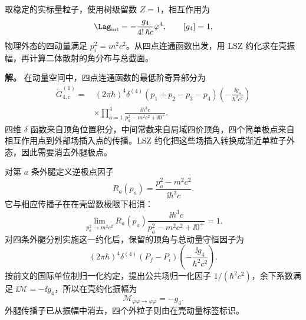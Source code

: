 
\begin{exbox}
取稳定的实标量粒子，使用树级留数 $Z=1$，相互作用为
\begin{equation*}
 \Lag_{\rm int}=-\frac{g_4}{4!\,\hbar c}\varphi^4,
 \qquad [g_4]=1,
\end{equation*}
物理外态的四动量满足 $p_i^2=m^2c^2$。从四点连通函数出发，用 LSZ 约化求在壳振幅，再计算二体散射的角分布与总截面。

\textbf{解。} 在动量空间中，四点连通函数的最低阶奇异部分为
\begin{equation}
 \begin{aligned}
 \widetilde G_{4,c}^{(1)}
 =&\,(2\pi\hbar)^4\delta^{(4)}(p_1+p_2-p_3-p_4)
 \left(-\frac{\ii g_4}{\hbar^2c^2}\right)\\
 &\times\prod_{a=1}^{4}
 \frac{\ii\hbar^3c}{p_a^2-m^2c^2+\ii0^+}.
 \end{aligned}
 \label{eq:phi4-fourpoint-poles-dp64}
\end{equation}
四维 $\delta$ 函数来自顶角位置积分，中间常数来自局域四价顶角，四个简单极点来自相互作用点到外部场插入点的传播。LSZ 约化把这些场插入转换成渐近单粒子外态，因此需要消去外腿极点。

对第 $a$ 条外腿定义逆极点因子
\begin{equation*}
 R_a(p_a)=\frac{p_a^2-m^2c^2}{\ii\hbar^3c}.
\end{equation*}
它与相应传播子在在壳留数极限下相消：
\[
 \lim_{p_a^2\to m^2c^2}
 R_a(p_a)\frac{\ii\hbar^3c}{p_a^2-m^2c^2+\ii0^+}=1.
\]
对四条外腿分别实施这一约化后，保留的顶角与总动量守恒因子为
\begin{equation*}
 (2\pi\hbar)^4\delta^{(4)}(P_f-P_i)
 \left(-\frac{\ii g_4}{\hbar^2c^2}\right).
\end{equation*}
按前文的国际单位制归一化约定，提出公共场归一化因子 $1/(\hbar^2c^2)$，余下系数满足 $\ii\mathcal M=-\ii g_4$，所以在壳约化振幅为
\begin{equation}
 \mathcal M_{\varphi\varphi\to\varphi\varphi}=-g_4.
 \label{eq:phi4-reduced-amplitude-dp64}
\end{equation}
外腿传播子已从振幅中消去，四个外粒子则由在壳动量标签标识。


\end{exbox}
